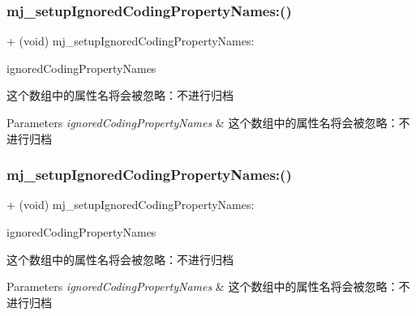 \subsubsection{\texorpdfstring{mj\+\_\+setup\+Ignored\+Coding\+Property\+Names\+:()}{mj\_setupIgnoredCodingPropertyNames:()}\hspace{0.1cm}{\footnotesize\ttfamily [2/3]}}
{\footnotesize\ttfamily + (void) mj\+\_\+setup\+Ignored\+Coding\+Property\+Names\+: \begin{DoxyParamCaption}\item[{(M\+J\+Ignored\+Coding\+Property\+Names)}]{ignored\+Coding\+Property\+Names }\end{DoxyParamCaption}}

这个数组中的属性名将会被忽略：不进行归档


\begin{DoxyParams}{Parameters}
{\em ignored\+Coding\+Property\+Names} & 这个数组中的属性名将会被忽略：不进行归档 \\
\hline
\end{DoxyParams}
\mbox{\label{category_n_s_object_07_m_j_class_08_ad89c658e8ab42bcba921a1c6e921c1cd}} 
\subsubsection{\texorpdfstring{mj\+\_\+setup\+Ignored\+Coding\+Property\+Names\+:()}{mj\_setupIgnoredCodingPropertyNames:()}\hspace{0.1cm}{\footnotesize\ttfamily [3/3]}}
{\footnotesize\ttfamily + (void) mj\+\_\+setup\+Ignored\+Coding\+Property\+Names\+: \begin{DoxyParamCaption}\item[{(M\+J\+Ignored\+Coding\+Property\+Names)}]{ignored\+Coding\+Property\+Names }\end{DoxyParamCaption}}

这个数组中的属性名将会被忽略：不进行归档


\begin{DoxyParams}{Parameters}
{\em ignored\+Coding\+Property\+Names} & 这个数组中的属性名将会被忽略：不进行归档 \\
\hline
\end{DoxyParams}
\mbox{\label{category_n_s_object_07_m_j_class_08_afd37a503c0b0d605038315aef0d3ef33}} 
